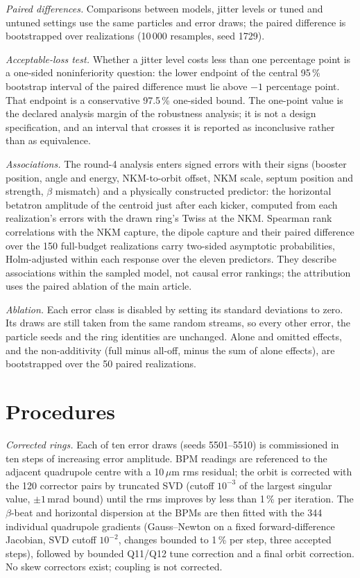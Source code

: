 \documentclass[aps,prab,preprint,amsmath,amssymb,floatfix,longbibliography]{revtex4-2}
\begin{document}
\emph{Paired differences.} Comparisons between models, jitter levels or tuned and untuned settings use the same
particles and error draws; the paired difference is bootstrapped over realizations (10\,000 resamples, seed 1729).

\emph{Acceptable-loss test.} Whether a jitter level costs less than one percentage point is a one-sided
noninferiority question: the lower endpoint of the central 95\,\% bootstrap interval of the paired difference must
lie above $-1$ percentage point. That endpoint is a conservative 97.5\,\% one-sided bound. The one-point value is the declared analysis margin of the robustness analysis; it is not a design
specification, and an interval that crosses it is reported as inconclusive rather than as equivalence.

\emph{Associations.} The round-4 analysis enters signed errors with their signs (booster position, angle and energy,
NKM-to-orbit offset, NKM scale, septum position and strength, $\beta$ mismatch) and a physically constructed predictor:
the horizontal betatron amplitude of the centroid just after each kicker, computed from each realization's errors with
the drawn ring's Twiss at the NKM. Spearman rank correlations with the NKM capture, the dipole capture and their paired
difference over the 150 full-budget realizations carry two-sided asymptotic probabilities, Holm-adjusted within each
response over the eleven predictors. They describe associations within the sampled model, not causal error rankings;
the attribution uses the paired ablation of the main article.

\emph{Ablation.} Each error class is disabled by setting its standard deviations to zero. Its draws are still taken
from the same random streams, so every other error, the particle seeds and the ring identities are unchanged. Alone
and omitted effects, and the non-additivity (full minus all-off, minus the sum of alone effects), are bootstrapped
over the 50 paired realizations.

\section{Procedures}
\label{sec:s-procedures}

\emph{Corrected rings.} Each of ten error draws (seeds 5501--5510) is commissioned in ten steps of increasing error
amplitude. BPM readings are referenced to the adjacent quadrupole centre with a 10\,$\mu$m rms residual; the orbit is
corrected with the 120 corrector pairs by truncated SVD (cutoff $10^{-3}$ of the largest singular value, $\pm1$\,mrad
bound) until the rms improves by less than 1\,\% per iteration. The $\beta$-beat and horizontal dispersion at the BPMs
are then fitted with the 344 individual quadrupole gradients (Gauss--Newton on a fixed forward-difference Jacobian,
SVD cutoff $10^{-2}$, changes bounded to 1\,\% per step, three accepted steps), followed by bounded Q11/Q12 tune
correction and a final orbit correction. No skew correctors exist; coupling is not corrected.
\end{document}
